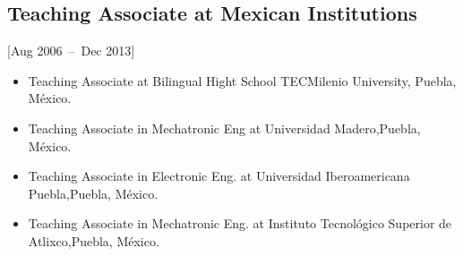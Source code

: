 \documentclass{mycv}
\begin{document}
\subsection{Teaching Associate at Mexican Institutions}[Aug 2006~--~Dec 2013]
\begin{itemize}
\item Teaching Associate at Bilingual Hight School TECMilenio University, Puebla, M\'exico.  
\item Teaching Associate in Mechatronic Eng at Universidad Madero,Puebla, M\'exico. 
\item Teaching Associate in Electronic Eng. at Universidad Iberoamericana Puebla,Puebla, M\'exico. 
\item Teaching Associate in Mechatronic Eng. at Instituto Tecnol\'ogico Superior de Atlixco,Puebla, M\'exico. 
\end{itemize}


%
\end{document}

